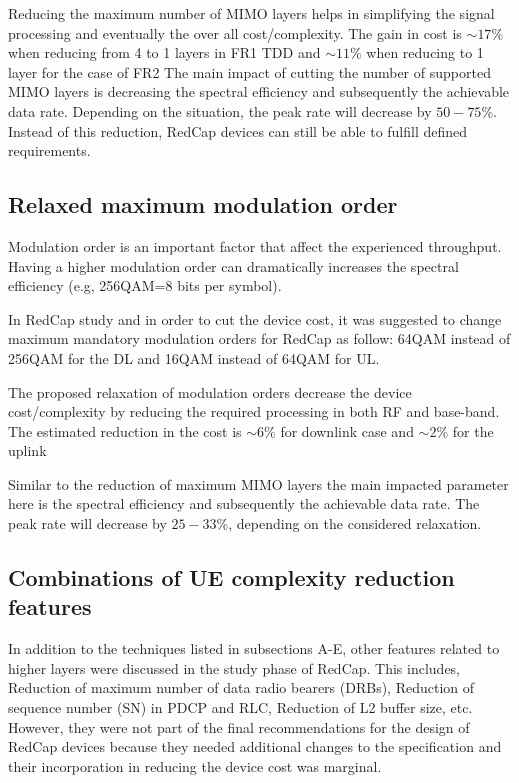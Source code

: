 \documentclass[conference]{IEEEtran}
\begin{document}
Reducing the maximum number of MIMO layers helps in simplifying the signal processing and eventually the over all cost/complexity. The gain in cost is $\sim17\%$ when reducing from 4 to 1 layers in FR1 TDD and $\sim11\%$ when reducing to 1 layer for the case of FR2
The main impact of cutting the number of supported MIMO layers is decreasing the spectral efficiency and subsequently the achievable data rate. Depending on the situation, the peak rate will decrease by $50-75\%$. Instead of this reduction, RedCap devices can still be able to fulfill defined requirements.

\subsection{Relaxed maximum modulation order}
\label{sec:4-5}

Modulation order is an important factor that affect the experienced throughput. Having a higher modulation order can dramatically increases the spectral efficiency (e.g, 256QAM=8 bits per symbol).

In RedCap study and in order to cut the device cost, it was suggested to change maximum mandatory modulation orders for RedCap as follow: 64QAM instead of 256QAM for the DL  and 16QAM instead of 64QAM for UL.

The proposed relaxation of modulation orders decrease the device cost/complexity by reducing the required processing in both RF and base-band. The estimated reduction in the cost is $\sim6\%$ for downlink case and $\sim2\%$ for the uplink

Similar to the reduction of maximum MIMO layers the main impacted parameter here is the spectral efficiency and subsequently the achievable data rate. The peak rate will decrease by $25-33\%$, depending on the considered relaxation. 

\subsection{Combinations of UE complexity reduction features}
\label{sec:4-6}
In addition to the techniques listed in subsections A-E, other features related to higher layers were discussed in the study phase of RedCap. This includes, Reduction of maximum number of data radio
bearers (DRBs), Reduction of sequence number (SN) in PDCP and RLC, Reduction of L2 buffer size, etc. However, they were not part of the final recommendations for the design of RedCap devices because they needed additional changes to the specification and their incorporation in reducing the device cost was marginal.
\end{document}
